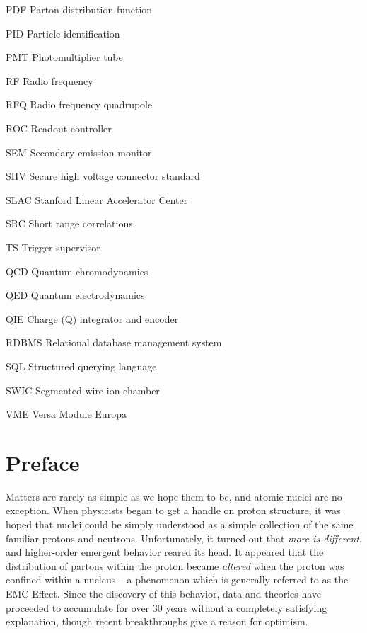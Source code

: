 \documentclass[edeposit,fullpage]{uiucthesis2009}
\begin{document}
\begin{symbollist*}
	\item[PDF] Parton distribution function
	\item[PID] Particle identification
	\item[PMT] Photomultiplier tube
	\item[RF] Radio frequency
	\item[RFQ] Radio frequency quadrupole
	\item[ROC] Readout controller
	\item[SEM] Secondary emission monitor
	\item[SHV] Secure high voltage connector standard
	\item[SLAC] Stanford Linear Accelerator Center
	\item[SRC] Short range correlations
	\item[TS] Trigger supervisor
	\item[QCD] Quantum chromodynamics
	\item[QED] Quantum electrodynamics
	\item[QIE] Charge (Q) integrator and encoder
	\item[RDBMS] Relational database management system
	\item[SQL] Structured querying language
	\item[SWIC] Segmented wire ion chamber
	\item[VME] Versa Module Europa
\end{symbollist*}

\mainmatter

\chapter*{Preface}

Matters are rarely as simple as we hope them to be, and atomic nuclei are no exception. When physicists began to get a handle on proton structure, it was hoped that nuclei could be simply understood as a simple collection of the same familiar protons and neutrons. Unfortunately, it turned out that \emph{more is different}, and higher-order emergent behavior reared its head. It appeared that the distribution of partons within the proton became \emph{altered} when the proton was confined within a nucleus -- a phenomenon which is generally referred to as the EMC Effect. Since the discovery of this behavior, data and theories have proceeded to accumulate for over 30 years without a completely satisfying explanation, though recent breakthroughs give a reason for optimism.
\end{document}
